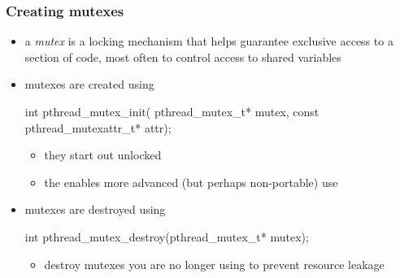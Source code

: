 \begin{frame}[fragile]
%
  \frametitle{Creating mutexes}
%
  \begin{itemize}
%
  \item a {\em mutex} is a locking mechanism that helps guarantee exclusive access to a section
    of code, most often to control access to shared variables
%
  \item mutexes are created using
%
    \begin{C}
int pthread_mutex_init(
    pthread_mutex_t* mutex, const pthread_mutexattr_t* attr);
    \end{C}
%
    \begin{itemize}
    \item they start out unlocked
    \item the  enables more advanced (but perhaps non-portable) use
    \end{itemize}
%
  \item mutexes are destroyed using
%
    \begin{C}
int pthread_mutex_destroy(pthread_mutex_t* mutex);
    \end{C}
%
    \begin{itemize}
    \item destroy mutexes you are no longer using to prevent resource leakage
    \end{itemize}
%
  \end{itemize}
%
\end{frame}

